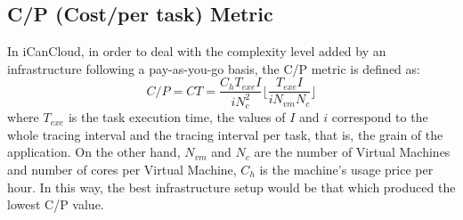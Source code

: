 \documentclass[3p, twocolumn]{elsarticle}
\begin{document}
\subsection{C/P (Cost/per task) Metric}
In iCanCloud, in order to deal with the complexity level added by an infrastructure following a pay-as-you-go basis, the C/P metric is defined as:
\begin{equation}
C/P=CT=\frac{C_hT_{exe}I}{iN_c^2} \lfloor{\frac{T_{exe}I}{iN_{vm}N_c} }\rfloor
\end{equation}
where $T_{exe}$ is the task execution time, the values of $I$ and $i$ correspond to the whole tracing interval and the tracing interval per task, that is, the grain of the application. On the other hand, $N_{vm}$ and $N_c$ are the number of Virtual Machines and number of cores per Virtual Machine, $C_h$ is the machine's usage price per hour. In this way, the best infrastructure setup would be that which produced the lowest C/P value.
\end{document}
